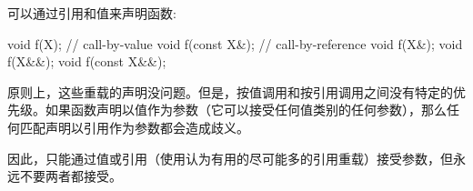 可以通过引用和值来声明函数:

\begin{cppcode}
void f(X); // call-by-value
void f(const X&); // call-by-reference
void f(X&);
void f(X&&);
void f(const X&&);
\end{cppcode}

原则上，这些重载的声明没问题。但是，按值调用和按引用调用之间没有特定的优先级。如果函数声明以值作为参数（它可以接受任何值类别的任何参数），那么任何匹配声明以引用作为参数都会造成歧义。

因此，只能通过值或引用（使用认为有用的尽可能多的引用重载）接受参数，但永远不要两者都接受。



































































